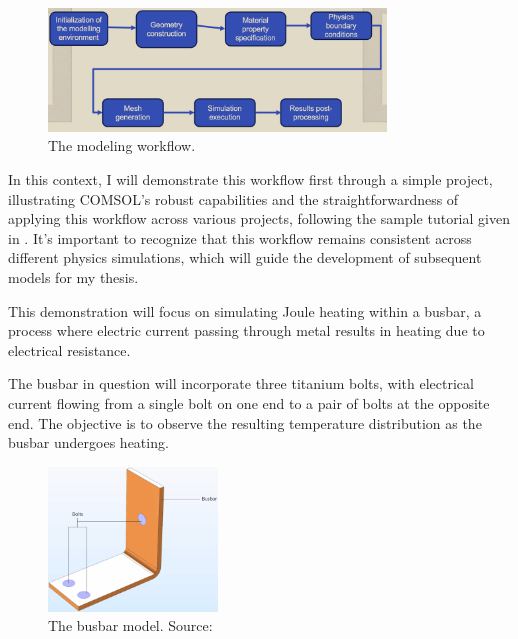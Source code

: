 \begin{figure}[H]
  \centering
  \includegraphics[width=0.8\textwidth]{Chapters/Figures/Chapter 3 Figures/COMSOL Modelling Workflow.png}
  \caption{The modeling workflow.}
  \label{fig:The modeling workflow.}
\end{figure}

In this context, I will demonstrate this workflow first through a simple project, illustrating COMSOL's robust capabilities and the straightforwardness of applying this workflow across various projects, following the sample tutorial given in \cite{multiphysics__modeling_nodate}. It's important to recognize that this workflow remains consistent across different physics simulations, which will guide the development of subsequent models for my thesis.

This demonstration will focus on simulating Joule heating within a busbar, a process where electric current passing through metal results in heating due to electrical resistance.

The busbar in question will incorporate three titanium bolts, with electrical current flowing from a single bolt on one end to a pair of bolts at the opposite end. The objective is to observe the resulting temperature distribution as the busbar undergoes heating.

\begin{figure}[H]
  \centering
  \includegraphics[width=0.4\textwidth]{Chapters/Figures/Chapter 3 Figures/Busbar.png}
  \caption{The busbar model. Source: \cite{multiphysics__modeling_nodate}}
  \label{fig:The busbar model}
\end{figure}

